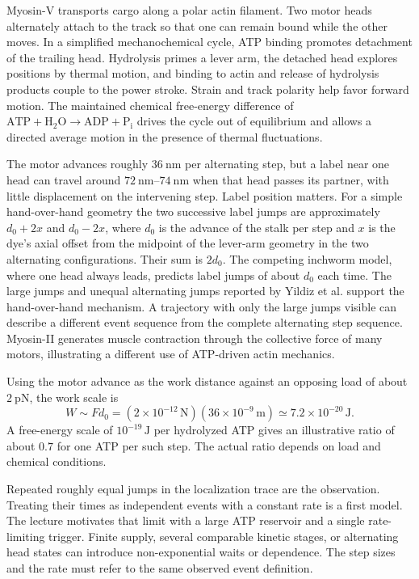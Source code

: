 Myosin-V transports cargo along a polar actin filament. Two motor heads alternately attach to the track so that one can remain bound while the other moves. In a simplified mechanochemical cycle, ATP binding promotes detachment of the trailing head. Hydrolysis primes a lever arm, the detached head explores positions by thermal motion, and binding to actin and release of hydrolysis products couple to the power stroke. Strain and track polarity help favor forward motion. The maintained chemical free-energy difference of $\mathrm{ATP}+\mathrm{H_2O}\to\mathrm{ADP}+\mathrm{P_i}$ drives the cycle out of equilibrium and allows a directed average motion in the presence of thermal fluctuations.

The motor advances roughly $\SI{36}{\nano\metre}$ per alternating step, but a label near one head can travel around $\SIrange{72}{74}{\nano\metre}$ when that head passes its partner, with little displacement on the intervening step. Label position matters. For a simple hand-over-hand geometry the two successive label jumps are approximately $d_0+2x$ and $d_0-2x$, where $d_0$ is the advance of the stalk per step and $x$ is the dye's axial offset from the midpoint of the lever-arm geometry in the two alternating configurations. Their sum is $2d_0$. The competing inchworm model, where one head always leads, predicts label jumps of about $d_0$ each time. The large jumps and unequal alternating jumps reported by Yildiz et al. support the hand-over-hand mechanism. A trajectory with only the large jumps visible can describe a different event sequence from the complete alternating step sequence. Myosin-II generates muscle contraction through the collective force of many motors, illustrating a different use of ATP-driven actin mechanics.

Using the motor advance as the work distance against an opposing load of about $\SI{2}{\pico\newton}$, the work scale is
\begin{equation}
 W\sim Fd_0=(2\times10^{-12}\,\mathrm N)(36\times10^{-9}\,\mathrm m)
          \simeq 7.2\times10^{-20}\,\mathrm J.
 \label{eq:l06-motor-work}
\end{equation}
A free-energy scale of $10^{-19}\,\mathrm J$ per hydrolyzed ATP gives an illustrative ratio of about $0.7$ for one ATP per such step. The actual ratio depends on load and chemical conditions.

\begin{remark}
Repeated roughly equal jumps in the localization trace are the observation. Treating their times as independent events with a constant rate is a first model. The lecture motivates that limit with a large ATP reservoir and a single rate-limiting trigger. Finite supply, several comparable kinetic stages, or alternating head states can introduce non-exponential waits or dependence. The step sizes and the rate must refer to the same observed event definition.
\end{remark}

